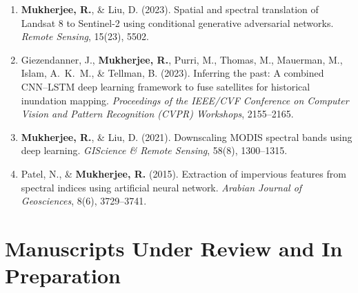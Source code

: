 \documentclass[10pt,letterpaper]{article}
\begin{document}
\begin{enumerate}[leftmargin=0.2in, itemsep=0.25em]
  \item \textbf{Mukherjee, R.}, \& Liu, D. (2023).
  Spatial and spectral translation of Landsat 8 to Sentinel-2 using conditional generative adversarial networks.
  \emph{Remote Sensing}, 15(23), 5502.

  \item Giezendanner, J., \textbf{Mukherjee, R.}, Purri, M., Thomas, M., Mauerman, M., Islam, A.\ K.\ M., \& Tellman, B. (2023).
  Inferring the past: A combined CNN--LSTM deep learning framework to fuse satellites for historical inundation mapping.
  \emph{Proceedings of the IEEE/CVF Conference on Computer Vision and Pattern Recognition (CVPR) Workshops}, 2155--2165.

  \item \textbf{Mukherjee, R.}, \& Liu, D. (2021).
  Downscaling MODIS spectral bands using deep learning.
  \emph{GIScience \& Remote Sensing}, 58(8), 1300--1315.

  \item Patel, N., \& \textbf{Mukherjee, R.} (2015).
  Extraction of impervious features from spectral indices using artificial neural network.
  \emph{Arabian Journal of Geosciences}, 8(6), 3729--3741.
\end{enumerate}

\normalsize

\section*{Manuscripts Under Review and In Preparation}
\end{document}
